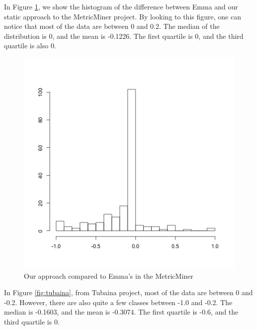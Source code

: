 \documentclass{sig-alternate}
\begin{document}
In Figure \ref{fig:metricminer}, we show the histogram of the difference between Emma and our static approach to
the MetricMiner project. By looking to this figure, one can notice that most of the data are between 0 and 0.2. 
The median of the distribution is 0, and the mean is -0.1226. The first quartile is 0, and the
third quartile is also 0.

\begin{figure}[h!H]
  \centering
  \includegraphics[scale=0.4]{../stats/metricminer-histograma-gelato.png}

  \caption{Our approach compared to Emma's in the MetricMiner}
  \label{fig:metricminer}
\end{figure}

In Figure \ref{fig:tubaina}, from Tubaina project, most of the data are between
0 and -0.2. However, there are also quite a few classes between -1.0 and -0.2. 
The median is -0.1603, and the mean is -0.3074. The first quartile is
-0.6, and the third quartile is 0.
\end{document}
